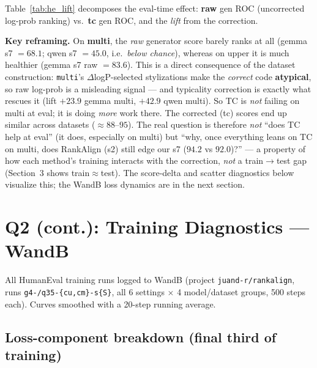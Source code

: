 \documentclass[11pt,a4paper]{article}
\begin{document}
Table~\ref{tab:he_lift} decomposes the eval-time effect: \textbf{raw} gen ROC (uncorrected
log-prob ranking) vs.\ \textbf{tc} gen ROC, and the \emph{lift} from the correction.

\begin{table}[H]
\centering
\caption{Eval-time raw vs.\ tc gen ROC ($\times100$), epoch 2, TC eval mode. lift $=$ tc $-$ raw.}
\label{tab:he_lift}

\end{table}

\textbf{Key reframing.} On \textbf{multi}, the \emph{raw} generator score barely ranks at all
(gemma s7 $=68.1$; qwen s7 $=45.0$, i.e.\ \emph{below chance}), whereas on upper it is much
healthier (gemma s7 raw $=83.6$). This is a direct consequence of the dataset construction:
\texttt{multi}'s $\Delta$logP-selected stylizations make the \emph{correct} code \textbf{atypical}, so
raw log-prob is a misleading signal --- and typicality correction is exactly what rescues it
(lift $+23.9$ gemma multi, $+42.9$ qwen multi). So TC is \emph{not} failing on multi at eval;
it is doing \emph{more} work there. The corrected (tc) scores end up similar across datasets
($\approx88$--$95$). The real question is therefore \emph{not} ``does TC help at eval'' (it
does, especially on multi) but ``why, once everything leans on TC on multi, does RankAlign
(s2) still edge our s7 ($94.2$ vs $92.0$)?'' --- a property of how each method's training
interacts with the correction, \emph{not} a train$\to$test gap (Section~3 shows train$\approx$test).
The score-delta and scatter diagnostics below visualize this; the WandB loss dynamics are in
the next section.

\section{Q2 (cont.): Training Diagnostics --- WandB}

All HumanEval training runs logged to WandB (project \texttt{juand-r/rankalign}, runs
\texttt{g4-/q35-\{cu,cm\}-s\{S\}}, all 6 settings $\times$ 4 model/dataset groups, 500 steps
each). Curves smoothed with a 20-step running average.

\subsection{Loss-component breakdown (final third of training)}
\end{document}
